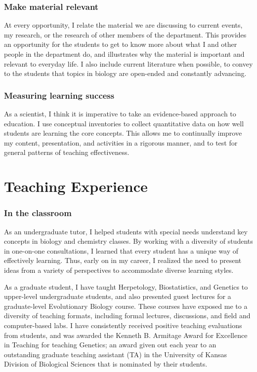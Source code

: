 \subsubsection*{Make material relevant}
At every opportunity, I relate the material we are discussing to current
events, my research, or the research of other members of the department.
This provides an opportunity for the students to get to know more about what I
and other people in the department do, and illustrates why the material is
important and relevant to everyday life.
I also include current literature when possible, to convey to the students that
topics in biology are open-ended and constantly advancing.

\subsubsection*{Measuring learning success}
As a scientist, I think it is imperative to take an evidence-based approach to
education.
I use conceptual inventories to collect quantitative data on how well students
are learning the core concepts.
This allows me to continually improve my content, presentation, and activities
in a rigorous manner, and to test for general patterns of teaching
effectiveness.

\section*{Teaching Experience}
\subsubsection*{In the classroom}
As an undergraduate tutor, I helped students with special needs understand
key concepts in biology and chemistry classes.
By working with a diversity of students in one-on-one consultations, I learned
that every student has a unique way of effectively learning.
Thus, early on in my career, I realized the need to present ideas from a
variety of perspectives to accommodate diverse learning styles.

As a graduate student, I have taught Herpetology, Biostatistics, and Genetics
to upper-level undergraduate students, and also presented guest lectures for a
graduate-level Evolutionary Biology course.
These courses have exposed me to a diversity of teaching formats, including
formal lectures, discussions, and field and computer-based labs.
I have consistently received positive teaching evaluations from students, and
was awarded the Kenneth B. Armitage Award for Excellence in Teaching for
teaching Genetics; an award given out each year to an outstanding graduate
teaching assistant (TA) in the University of Kansas Division of Biological
Sciences that is nominated by their students.

